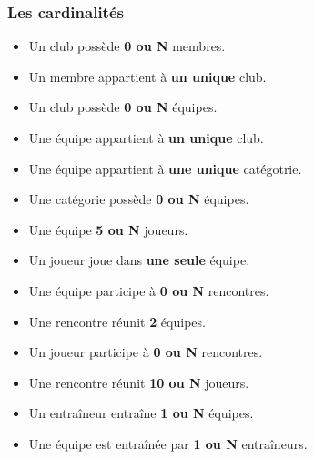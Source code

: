 \documentclass{article}
\begin{document}
\subsubsection*{Les cardinalités}
\begin{itemize}
\item Un club possède \textbf{0 ou N} membres. \\

\item Un membre appartient à \textbf{un unique} club. \\

\item Un club possède \textbf{0 ou N} équipes. \\

\item Une équipe appartient à \textbf{un unique} club. \\

\item Une équipe appartient à \textbf{une unique} catégotrie. \\

\item Une catégorie possède \textbf{0 ou N} équipes. \\

\item Une équipe \textbf{5 ou N} joueurs. \\

\item Un joueur joue dans \textbf{une seule} équipe. \\

\item Une équipe participe à \textbf{0 ou N} rencontres. \\

\item Une rencontre réunit \textbf{2} équipes. \\

\item Un joueur participe à \textbf{0 ou N} rencontres. \\

\item Une rencontre réunit \textbf{10 ou N} joueurs. \\

\item Un entraîneur entraîne \textbf{1 ou N} équipes. \\

\item Une équipe est entraînée par \textbf{1 ou N} entraîneurs. \\
\end{itemize}
\end{document}
